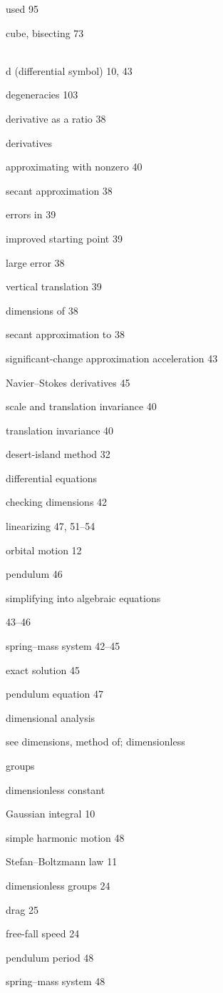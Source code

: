 \documentclass[b5paper]{article}
\begin{document}
\begin{multicols}{2}
\quad used 95\par
cube, bisecting 73\par\quad\quad
~\\
d (differential symbol) 10, 43\par\quad
degeneracies 103\par
derivative as a ratio 38\par
derivatives\par\quad
approximating with nonzero  40\par
secant approximation 38\par\quad
errors in 39\par\quad
improved starting point 39\par\quad
large error 38\par
vertical translation 39\par
dimensions of 38\par\quad\quad\quad
secant approximation to 38\par
significant-change approximation
acceleration 43\par
Navier–Stokes derivatives 45\par
scale and translation invariance 40\par
translation invariance 40\par\quad\quad\quad
desert-island method 32\par\quad\quad
differential equations\par
checking dimensions 42\par\quad
linearizing 47, 51–54\par\quad
orbital motion 12\par\quad
pendulum 46\par\quad
simplifying into algebraic equations\par
43–46\par\quad
spring–mass system 42–45\par\quad
exact solution 45\par\quad
pendulum equation 47\par
dimensional analysis\par
see dimensions, method of; dimensionless\par
groups\par\quad
dimensionless constant\par
Gaussian integral 10\par
simple harmonic motion 48\par
Stefan–Boltzmann law 11\par
dimensionless groups 24\par\quad\quad
drag 25\par\quad
free-fall speed 24\par\quad
pendulum period 48\par
spring–mass system 48\par
\end{multicols}
\end{document}
